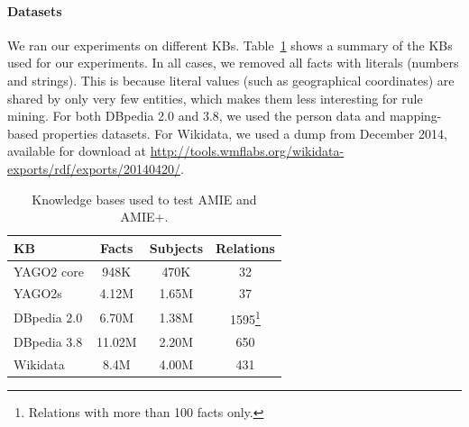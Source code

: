 \paragraph{Datasets} We ran our experiments on different KBs. Table~\ref{kbs} shows a summary of the KBs used for our experiments.
In all cases, we removed all facts with literals (numbers and strings).
This is because literal values (such as geographical coordinates) are shared by only very few entities,
which makes them less interesting for rule mining.
For both DBpedia 2.0 and 3.8, we used the person data and mapping-based properties datasets.
For Wikidata, we used a dump from December 2014, available for download at \url{http://tools.wmflabs.org/wikidata-exports/rdf/exports/20140420/}.

\begin{savenotes}
\begin{table}
\centering
\footnotesize
\begin{tabular}{l|c|c|c}
KB & Facts & Subjects & Relations\\
\hline
YAGO2 core  & 948K & 470K & 32\\
YAGO2s & 4.12M  & 1.65M & 37\\
DBpedia 2.0 & 6.70M & 1.38M & 1595\footnote{Relations with more than 100 facts only.} \\
DBpedia 3.8 & 11.02M & 2.20M & 650 \\
Wikidata & 8.4M & 4.00M & 431
\end{tabular}
\caption{Knowledge bases used to test AMIE and AMIE+.}
\label{kbs}
\end{table}
\end{savenotes}


